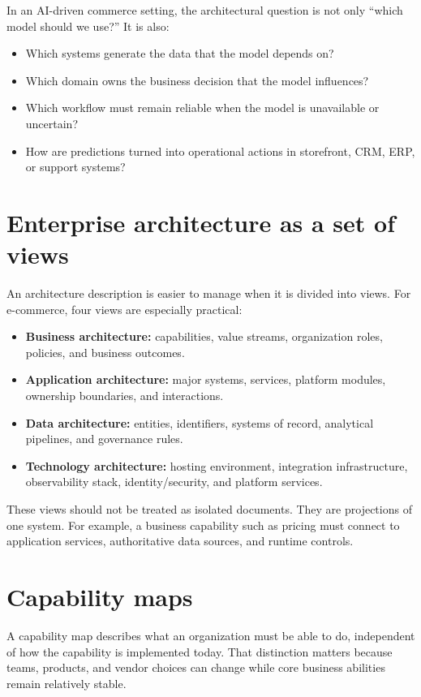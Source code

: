 In an AI-driven commerce setting, the architectural question is not only ``which model should we use?''
It is also:
\begin{itemize}
  \item Which systems generate the data that the model depends on?
  \item Which domain owns the business decision that the model influences?
  \item Which workflow must remain reliable when the model is unavailable or uncertain?
  \item How are predictions turned into operational actions in storefront, CRM, ERP, or support systems?
\end{itemize}

\section{Enterprise architecture as a set of views}
An architecture description is easier to manage when it is divided into views.
For e-commerce, four views are especially practical:
\begin{itemize}
  \item \textbf{Business architecture:} capabilities, value streams, organization roles, policies, and business outcomes.
  \item \textbf{Application architecture:} major systems, services, platform modules, ownership boundaries, and interactions.
  \item \textbf{Data architecture:} entities, identifiers, systems of record, analytical pipelines, and governance rules.
  \item \textbf{Technology architecture:} hosting environment, integration infrastructure, observability stack, identity/security, and platform services.
\end{itemize}

These views should not be treated as isolated documents.
They are projections of one system.
For example, a business capability such as pricing must connect to application services, authoritative data sources, and runtime controls.

\section{Capability maps}
A capability map describes what an organization must be able to do, independent of how the capability is implemented today.
That distinction matters because teams, products, and vendor choices can change while core business abilities remain relatively stable.

